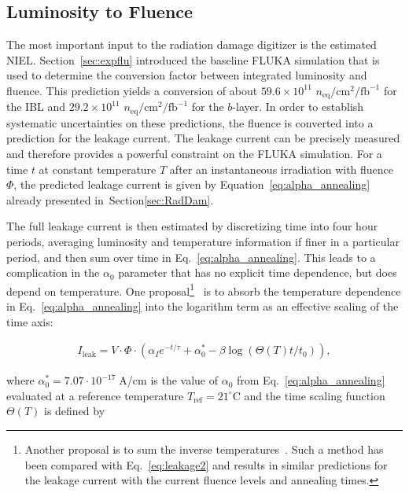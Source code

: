 \subsection{Luminosity to Fluence}
\label{sec:fluence}



 The most important input to the radiation damage digitizer is the estimated NIEL.  
 Section~\ref{sec:expflu} introduced the baseline FLUKA simulation that is used to determine the 
 conversion factor between integrated luminosity and fluence. This prediction yields a conversion of
  about $59.6\times 10^{11}$ $n_\text{eq}/\text{cm}^2/\text{fb}^{-1}$ for the IBL and $29.2\times 10^{11}$ $n_\text{eq}/\text{cm}^2/\text{fb}^{-1}$ for the $b$-layer. In order to establish systematic uncertainties on these predictions, the fluence is converted into a prediction for the leakage current. The leakage 
current can be precisely measured and therefore provides a powerful constraint on the FLUKA simulation. For a time $t$ at constant temperature $T$ after an instantaneous irradiation with fluence $\Phi$, the predicted leakage current is given by Equation~\ref{eq:alpha_annealing} already presented 
in~Section\ref{sec:RadDam}.

The full leakage current is then estimated by discretizing time into four hour periods, averaging luminosity and temperature information if finer in a particular period, and then sum over time in Eq.~\ref{eq:alpha_annealing}.  This leads to a complication in the $\alpha_0$ parameter that has no explicit time dependence, but does depend on temperature.  One proposal\footnote{Another proposal is to sum the inverse temperatures~\cite{Barney:1709387}.  Such a method has been compared with Eq.~\ref{eq:leakage2} and results in similar predictions for the leakage current with the current fluence levels and annealing times.}~\cite{moll-thesis} is to absorb the temperature dependence in Eq.~\ref{eq:alpha_annealing} into the logarithm term as an effective scaling of the time axis:

\begin{align}
\label{eq:leakage2}
I_\text{leak}=V\cdot\Phi\cdot\left(\alpha_Ie^{-t/\tau}+\alpha_0^*-\beta\log(\Theta(T)t/t_0)\right),
\end{align}

\noindent where $\alpha_0^*=7.07\cdot 10^{-17}\;$A/cm is the value of $\alpha_0$ from Eq.~\ref{eq:alpha_annealing} evaluated at a reference temperature $T_\text{ref}=21^{\circ}$C and the time scaling function $\Theta(T)$ is defined by

